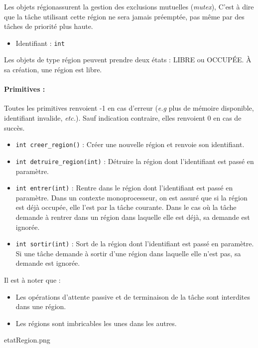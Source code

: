 {
Les objets \og région\fg assurent la gestion des exclusions mutuelles (\textsl{mutex}), C'est à dire que la tâche utilisant cette région ne sera jamais préemptée, pas même par des tâches de priorité plus haute.
}
{
\begin{itemize}
	\item Identifiant : \texttt{int}
\end{itemize}
}
{
Les objets de type région peuvent prendre deux états : LIBRE ou OCCUPÉE. À sa création, une région est libre.

\paragraph{Primitives :}
Toutes les primitives renvoient -1 en cas d'erreur (\textsl{e.g} plus de mémoire disponible, identifiant invalide, \textsl{etc.}). Sauf indication contraire, elles renvoient 0 en cas de succès.

\begin{itemize}
	\item \texttt{int creer\_region()} : Créer une nouvelle région et renvoie son identifiant.
	\item \texttt{int detruire\_region(int)} : Détruire la région dont l'identifiant est passé en paramètre. 
	\item \texttt{int entrer(int)} : Rentre dans le région dont l'identifiant est passé en paramètre. Dans un contexte monoprocesseur, on est assuré que si la région est déjà occupée, elle l'est par la tâche courante. Dans le cas où la tâche demande à rentrer dans un région dans laquelle elle est déjà, sa demande est ignorée.
	\item \texttt{int sortir(int)} : Sort de la région dont l'identifiant est passé en paramètre. Si une tâche demande à sortir d'une région dans laquelle elle n'est pas, sa demande est ignorée.
\end{itemize}
}
{
Il est à noter que :
\begin{itemize}
	\item Les opérations d'attente passive et de terminaison de la tâche sont interdites dans une région.
	\item Les régions sont imbricables les unes dans les autres.
\end{itemize}
}
{etatRegion.png}

